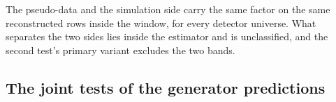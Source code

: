 The pseudo-data and the simulation side carry the same factor on the same reconstructed rows inside the window, for every detector universe. What separates the two sides lies inside the estimator and is unclassified, and the second test's primary variant excludes the two bands.

\subsection{The joint tests of the generator predictions}
\label{supp:joint}

